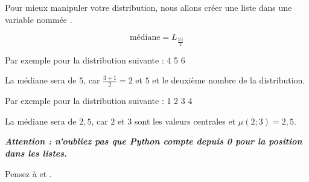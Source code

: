 \documentclass[11pt,a4paper]{article}
\begin{document}
\bigskip

Pour mieux manipuler votre distribution, nous allons créer une liste dans une variable nommée .

\bigskip



\bigskip


\begin{center} %
\begin{equation*}
\text{médiane} = L_{\frac{|L|}{2}}
\end{equation*}
\end{center}

\bigskip

Par exemple pour la distribution suivante : 4 5 6

La médiane sera de $ 5 $, car $ \frac{3 + 1}{2} = 2 $ et $ 5 $ et le deuxième nombre de la distribution.

\bigskip

Par exemple pour la distribution suivante : 1 2 3 4

La médiane sera de $ 2,5 $, car $ 2 $ et $ 3 $ sont les valeurs centrales et $ \mu(2 ; 3) = 2,5 $.

\bigskip

\textbf{\textit{Attention : n'oubliez pas que Python compte depuis 0 pour la position dans les listes.}}

\bigskip

Pensez à  et .
\end{document}
